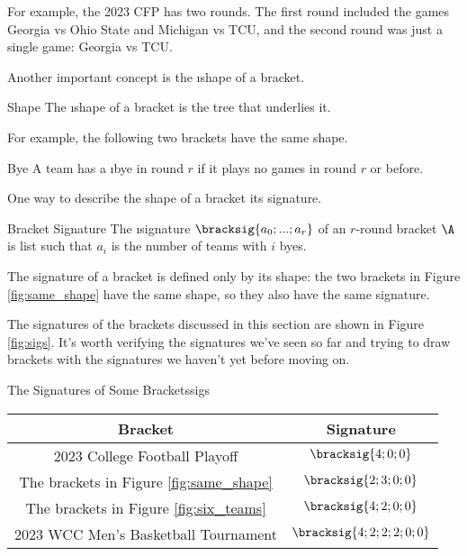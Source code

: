 {For example, the 2023 CFP has two rounds. The first round included the games Georgia vs Ohio State and Michigan vs TCU, and the second round was just a single game: Georgia vs TCU.

Another important concept is the \i{shape} of a bracket.

\begin{definition}{Shape}{}
    The \i{shape} of a bracket is the tree that underlies it.
\end{definition}

For example, the following two brackets have the same shape.


\begin{definition}{Bye}{}
    A team has a \i{bye} in round $r$ if it plays no games in round $r$ or before.
\end{definition}

One way to describe the shape of a bracket its signature.

\begin{definition}{Bracket Signature}{}
    The \i{signature} $\bracksig{a_0; ...; a_r}$ of an $r$-round bracket $\A$ is list such that $a_i$ is the number of teams with $i$ byes.
\end{definition}

The signature of a bracket is defined only by its shape: the two brackets in Figure \ref{fig:same_shape} have the same shape, so they also have the same signature.

The signatures of the brackets discussed in this section are shown in Figure \ref{fig:sigs}. It's worth verifying the signatures we've seen so far and trying to draw brackets with the signatures we haven't yet before moving on.

\begin{figg}{The Signatures of Some Brackets}{sigs}
    \begin{tabular}{ c | c }
         Bracket & Signature \\
         \hline
         2023 College Football Playoff & $\bracksig{4; 0; 0}$ \\
         The brackets in Figure \ref{fig:same_shape} & $\bracksig{2; 3; 0; 0}$\\
         The brackets in Figure \ref{fig:six_teams} & $\bracksig{4; 2; 0; 0}$\\
         2023 WCC Men's Basketball Tournament & $\bracksig{4;2;2;2;0;0}$ \\
    \end{tabular}
\end{figg}

}
